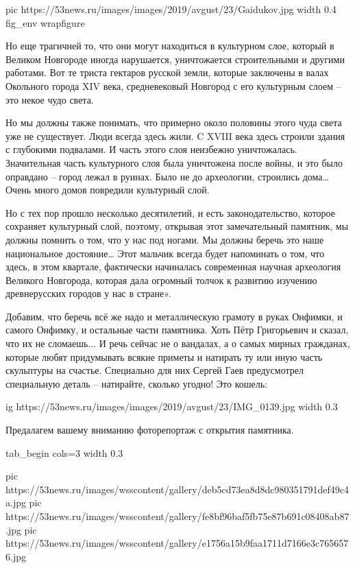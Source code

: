 \ifcmt
  pic https://53news.ru/images/images/2019/avgust/23/Gaidukov.jpg
  width 0.4
  fig_env wrapfigure
\fi

Но еще трагичней то, что они могут находиться в культурном слое, который в
Великом Новгороде иногда нарушается, уничтожается строительными и другими
работами. Вот те триста гектаров русской земли, которые заключены в валах
Окольного города XIV века, средневековый Новгород с его культурным слоем – это
некое чудо света.

Но мы должны также понимать, что примерно около половины этого чуда света уже
не существует. Люди всегда здесь жили. C XVIII века здесь строили здания с
глубокими подвалами. И часть этого слоя неизбежно уничтожалась. Значительная
часть культурного слоя была уничтожена после войны, и это было оправдано –
город лежал в руинах. Было не до археологии, строились дома… Очень много домов
повредили культурный слой.

Но с тех пор прошло несколько десятилетий, и есть законодательство, которое
сохраняет культурный слой, поэтому, открывая этот замечательный памятник, мы
должны помнить о том, что у нас под ногами. Мы должны беречь это наше
национальное достояние… Этот мальчик всегда будет напоминать о том, что здесь,
в этом квартале, фактически начиналась современная научная археология Великого
Новгорода, которая дала огромный толчок к развитию изучению древнерусских
городов у нас в стране».

Добавим, что беречь всё же надо и металлическую грамоту в руках Онфимки, и
самого Онфимку, и остальные части памятника. Хоть Пётр Григорьевич и сказал,
что их не сломаешь... И речь сейчас не о вандалах, а о самых мирных гражданах,
которые любят придумывать всякие приметы и натирать ту или иную часть
скульптуры на счастье. Специально для них Сергей Гаев предусмотрел специальную
деталь – натирайте, сколько угодно! Это кошель:

\begin{center}
\ifcmt
ig https://53news.ru/images/images/2019/avgust/23/IMG_0139.jpg
width 0.3
\fi
\end{center}

Предалагем вашему вниманию фоторепортаж с открытия памятника. 

\ifcmt
tab_begin cols=3
	width 0.3

pic https://53news.ru/images/wsscontent/gallery/deb5cd73ea8d8dc980351791def49c4a.jpg
pic https://53news.ru/images/wsscontent/gallery/fe8bf96baf5fb75e87b691c08408ab87.jpg
pic https://53news.ru/images/wsscontent/gallery/e1756a15b9faa1711d7166e3c7656576.jpg

